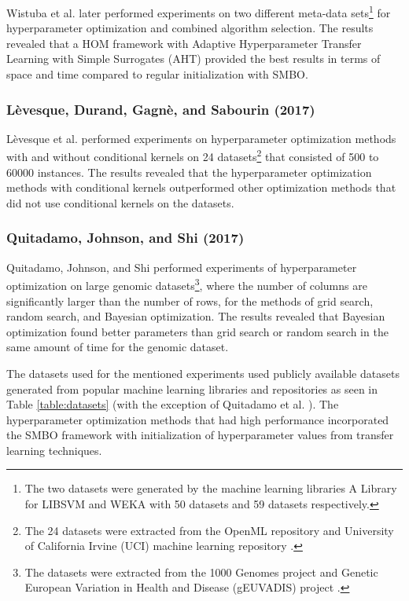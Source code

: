 Wistuba et al. \cite{Wistuba:2016} later performed experiments on two different meta-data sets\footnote{The two datasets were generated by the machine learning libraries A Library for LIBSVM \cite{Chang:2011} and WEKA \cite{Hall:2009} with 50 datasets and 59 datasets respectively.} for hyperparameter optimization and combined algorithm selection. The results revealed that a HOM framework with Adaptive Hyperparameter Transfer Learning with Simple Surrogates (AHT) provided the best results in terms of space and time compared to regular initialization with SMBO.

\subsubsection{L\`evesque, Durand, Gagn\`e, and Sabourin (2017)}

L\`evesque et al. \cite{Levesque:2017} performed experiments on hyperparameter optimization methods with and without conditional kernels on 24 datasets\footnote{The 24 datasets were extracted from the OpenML repository \cite{Vanschoren:2014} and University of California Irvine (UCI) machine learning repository \cite{Lichman:2013}.} that consisted of 500 to 60000 instances. The results revealed that the hyperparameter optimization methods with conditional kernels outperformed other optimization methods that did not use conditional kernels on the datasets.

\subsubsection{Quitadamo, Johnson, and Shi (2017)}

Quitadamo, Johnson, and Shi \cite{Quitadamo:2017} performed experiments of hyperparameter optimization on large genomic datasets\footnote{The datasets were extracted from the 1000 Genomes project \cite{Sudmant:2015} and Genetic European Variation in Health and Disease (gEUVADIS) project \cite{Lappalainen:2013}.}, where the number of columns are significantly larger than the number of rows, for the methods of grid search, random search, and Bayesian optimization. The results revealed that Bayesian optimization found better parameters than grid search or random search in  the same amount of time for the genomic dataset.

The datasets used for the mentioned experiments used publicly available datasets generated from popular machine learning libraries and repositories as seen in Table \ref{table:datasets} (with the exception of Quitadamo et al. \cite{Quitadamo:2017}). The hyperparameter optimization methods that had high performance incorporated the SMBO framework with initialization of hyperparameter values from transfer learning techniques.

